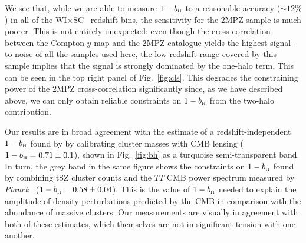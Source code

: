 \documentclass[useAMS,usenatbib]{mn2e}
\newcommand{\wisc}{WI$\times$SC}
\def\bH{b_{\scriptscriptstyle\rm H}}
\def\planck{{\it Planck\/}}
\begin{document}
      We see that, while we are able to measure $1-\bH$ to a reasonable accuracy ($\sim12\%$) in all of the \wisc~ redshift bins, the sensitivity for the 2MPZ sample is much poorer. This is not entirely unexpected: even though the cross-correlation between the Compton-$y$ map and the 2MPZ catalogue yields the highest signal-to-noise of all the samples used here, the low-redshift range covered by this sample implies that the signal is strongly dominated by the one-halo term. This can be seen in the top right panel of Fig.\!~\ref{fig:cls}. This degrades the constraining power of the 2MPZ cross-correlation significantly since, as we have described above, we can only obtain reliable constraints on $1-\bH$ from the two-halo contribution.
            
      Our results are in broad agreement with the estimate of a redshift-independent $1-\bH$ found by \cite{2019arXiv190407887Z} by calibrating cluster masses with CMB lensing ($1-\bH=0.71\pm0.1$), shown in Fig.\!~\ref{fig:bh} as a turquoise semi-transparent band. In turn, the grey band in the same figure shows the constraints on $1-\bH$ found by combining tSZ cluster counts and the $TT$ CMB power spectrum measured by \planck\ \citep{2016A&A...594A..24P} ($1-\bH=0.58\pm0.04$). This is the value of $1-\bH$ needed to explain the amplitude of density perturbations predicted by the CMB in comparison with the abundance of massive clusters. Our measurements are visually in agreement with both of these estimates, which themselves are not in significant tension with one another.
      
\end{document}

